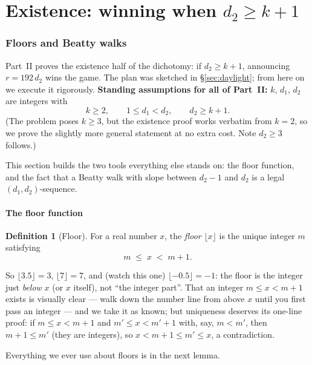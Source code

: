 \documentclass[11pt,reqno]{amsart}
\theoremstyle{plain}
\theoremstyle{definition}
\newtheorem{definition}[theorem]{Definition}
\theoremstyle{remark}
\begin{document}
\part{Existence: winning when \texorpdfstring{$d_2 \ge k+1$}{d2 >= k+1}}

\section{Floors and Beatty walks}\label{sec:beatty}

Part~II proves the existence half of the dichotomy: if $d_2 \ge k+1$, announcing
$r = 192\,d_2$ wins the game. The plan was sketched in \S\ref{sec:daylight}; from here
on we execute it rigorously. \textbf{Standing assumptions for all of Part~II:} $k$,
$d_1$, $d_2$ are integers with
\[
  k \ge 2, \qquad 1 \le d_1 < d_2, \qquad d_2 \ge k + 1 .
\]
(The problem poses $k \ge 3$, but the existence proof works verbatim from $k = 2$, so
we prove the slightly more general statement at no extra cost. Note $d_2 \ge 3$
follows.)

This section builds the two tools everything else stands on: the floor function, and
the fact that a Beatty walk with slope between $d_2 - 1$ and $d_2$ is a legal
$(d_1,d_2)$-sequence.

\subsection{The floor function}

\begin{definition}[Floor]\label{def:floor}
For a real number $x$, the \emph{floor} $\lfloor x \rfloor$ is the unique integer $m$
satisfying
\[
  m \;\le\; x \;<\; m + 1 .
\]
\end{definition}

So $\lfloor 3.5 \rfloor = 3$, $\lfloor 7 \rfloor = 7$, and (watch this one)
$\lfloor -0.5 \rfloor = -1$: the floor is the integer just \emph{below} $x$ (or $x$
itself), not ``the integer part''. That an integer $m \le x < m+1$ exists is visually
clear --- walk down the number line from above $x$ until you first pass an integer ---
and we take it as known; but uniqueness deserves its one-line proof: if
$m \le x < m+1$ and $m' \le x < m'+1$ with, say, $m < m'$, then $m + 1 \le m'$ (they
are integers), so $x < m + 1 \le m' \le x$, a contradiction.

Everything we ever use about floors is in the next lemma.
\end{document}
